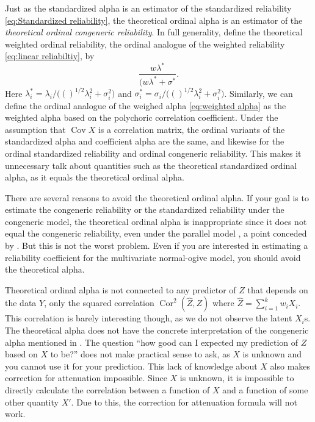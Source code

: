 \documentclass[twoside]{article}
\DeclareMathOperator{\Cor}{Cor}
\DeclareMathOperator{\Cov}{Cov}
\renewcommand{\sqrt}[1]{{(#1)^{1/2}}}
\begin{document}
Just as the standardized alpha is an estimator of the standardized reliability \cref{eq:Standardized reliability}, the theoretical ordinal alpha is an estimator of the \textit{theoretical ordinal congeneric reliability}. In full generality, define the theoretical weighted ordinal reliability, the ordinal analogue of the weighted reliability \eqref{eq:linear reliabiltiy}, by
\begin{equation}
\frac{w\lambda^*}{(w\lambda^* + \sigma^*}.
\end{equation}
Here $\lambda_i^* = \lambda_i/\sqrt(\lambda_i^2 + \sigma_i^2)$ and $\sigma_i^* = \sigma_i/\sqrt(\lambda_i^2 + \sigma_i^2)$. Similarly, we can define the ordinal analogue of the weighed alpha \eqref{eq:weighted alpha} as the weighted alpha based on the polychoric correlation coefficient. Under the assumption that $\Cov X$ is a correlation matrix, the ordinal variants of the standardized alpha and coefficient alpha are the same, and likewise for the ordinal standardized reliability and ordinal congeneric reliability. This makes it unnecessary talk about quantities such as the theoretical standardized ordinal alpha, as it equals the theoretical ordinal alpha. 

There are several reasons to avoid the theoretical ordinal alpha. If your
goal is to estimate the congeneric reliability or the standardized
reliability under the congeneric model, the theoretical ordinal alpha is inappropriate since
it does not equal the congeneric reliability, even under the parallel
model \citep[p. 1062, "Misconception 2"]{Chalmers2018-fj}, a point
conceded by \citet{Zumbo2019-lm}. But this is not the worst problem.
Even if you are interested in estimating a reliability coefficient
for the multivariate normal-ogive model, you should avoid the theoretical
alpha.

Theoretical ordinal alpha is not connected to any predictor
of $Z$ that depends on the data $Y$, only the squared correlation $\Cor^{2}(\hat{Z},Z)$ where $\hat{Z}=\sum_{i=1}^k w_iX_i$. This correlation is barely interesting though, as we do not observe
the latent $X_{i}$s. The theoretical alpha does not have the concrete
interpretation of the congeneric alpha mentioned in . The question
``how good can I expected my prediction of $Z$ based on $X$ to
be?'' does not make practical sense to ask, as $X$ is unknown and you cannot use it for your prediction. This
lack of knowledge about $X$ also makes correction for attenuation
impossible. Since $X$ is unknown, it is impossible to directly calculate
the correlation between a function of $X$ and a function of some
other quantity $X'$. Due to this, the correction for attenuation formula
will not work. 
\end{document}
